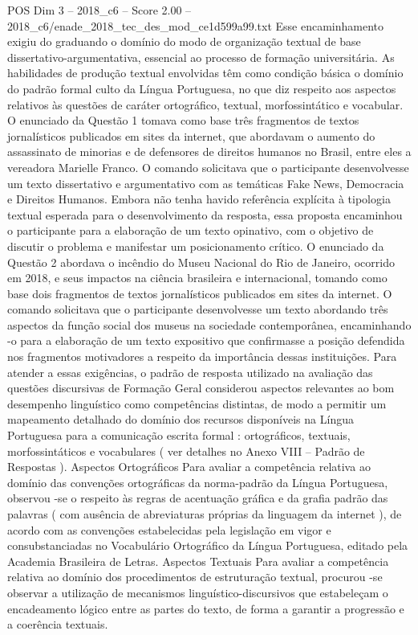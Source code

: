 \begin{textsample}{POS Dim 3 – 2018\_c6 – Score 2.00 – 2018\_c6/enade\_2018\_tec\_des\_mod\_ce1d599a99.txt}
Esse encaminhamento exigiu do graduando o domínio do modo de organização textual de base dissertativo-argumentativa, essencial ao processo de formação universitária.
As habilidades de produção textual envolvidas têm como condição básica o domínio do padrão formal culto da Língua Portuguesa, no que diz respeito aos aspectos relativos às questões de caráter ortográfico, textual, morfossintático e vocabular.
O enunciado da Questão 1 tomava como base três fragmentos de textos jornalísticos publicados em sites da internet, que abordavam o aumento do assassinato de minorias e de defensores de direitos humanos no Brasil, entre eles a vereadora Marielle Franco.
O comando solicitava que o participante desenvolvesse um texto dissertativo e argumentativo com as temáticas Fake News, Democracia e Direitos Humanos.
Embora não tenha havido referência explícita à tipologia textual esperada para o desenvolvimento da resposta, essa proposta encaminhou o participante para a elaboração de um texto opinativo, com o objetivo de discutir o problema e manifestar um posicionamento crítico.
O enunciado da Questão 2 abordava o incêndio do Museu Nacional do Rio de Janeiro, ocorrido em 2018, e seus impactos na ciência brasileira e internacional, tomando como base dois fragmentos de textos jornalísticos publicados em sites da internet.
O comando solicitava que o participante desenvolvesse um texto abordando três aspectos da função social dos museus na sociedade contemporânea, encaminhando -o para a elaboração de um texto expositivo que confirmasse a posição defendida nos fragmentos motivadores a respeito da importância dessas instituições.
Para atender a essas exigências, o padrão de resposta utilizado na avaliação das questões discursivas de Formação Geral considerou aspectos relevantes ao bom desempenho linguístico como competências distintas, de modo a permitir um mapeamento detalhado do domínio dos recursos disponíveis na Língua Portuguesa para a comunicação escrita formal : ortográficos, textuais, morfossintáticos e vocabulares ( ver detalhes no Anexo VIII – Padrão de Respostas ).
Aspectos Ortográficos Para avaliar a competência relativa ao domínio das convenções ortográficas da norma-padrão da Língua Portuguesa, observou -se o respeito às regras de acentuação gráfica e da grafia padrão das palavras ( com ausência de abreviaturas próprias da linguagem da internet ), de acordo com as convenções estabelecidas pela legislação em vigor e consubstanciadas no Vocabulário Ortográfico da Língua Portuguesa, editado pela Academia Brasileira de Letras.
Aspectos Textuais Para avaliar a competência relativa ao domínio dos procedimentos de estruturação textual, procurou -se observar a utilização de mecanismos linguístico-discursivos que estabeleçam o encadeamento lógico entre as partes do texto, de forma a garantir a progressão e a coerência textuais.

\end{textsample}
